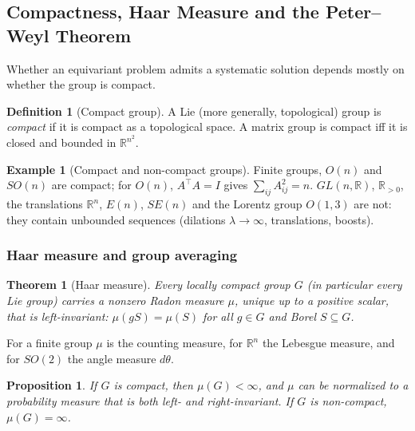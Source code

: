 \documentclass[11pt]{article}
\theoremstyle{plain}
\newtheorem{Theorem}{Theorem}[section]
\newtheorem{Proposition}{Proposition}[section]
\theoremstyle{definition}
\newtheorem{Definition}{Definition}[section]
\newtheorem{Example}{Example}[section]
\begin{document}
\subsection{Compactness, Haar Measure and the Peter--Weyl Theorem}
\label{subsec:compactness-peter-weyl}

Whether an equivariant problem admits a systematic solution depends mostly on whether the group is compact.

\begin{Definition}[Compact group]\label{def:compact-group}
A Lie (more generally, topological) group is \emph{compact} if it is compact as a topological space.
A matrix group is compact iff it is closed and bounded in $\mathbb{R}^{n^2}$.
\end{Definition}

\begin{Example}[Compact and non-compact groups]\label{ex:compactness}
Finite groups, $O(n)$ and $SO(n)$ are compact; for $O(n)$, $A^\top A = I$ gives $\sum_{ij}A_{ij}^2 = n$.
$GL(n,\mathbb{R})$, $\mathbb{R}_{>0}$, the translations $\mathbb{R}^n$, $E(n)$, $SE(n)$ and the Lorentz group $O(1,3)$ are not: they contain unbounded sequences (dilations $\lambda\to\infty$, translations, boosts).
\end{Example}

\subsubsection{Haar measure and group averaging}
\label{subsubsec:haar-measure}

\begin{Theorem}[Haar measure]\label{thm:haar-measure}
Every locally compact group $G$ (in particular every Lie group) carries a nonzero Radon measure $\mu$, unique up to a positive scalar, that is \emph{left-invariant}: $\mu(gS) = \mu(S)$ for all $g\in G$ and Borel $S\subseteq G$.
\end{Theorem}

For a finite group $\mu$ is the counting measure, for $\mathbb{R}^n$ the Lebesgue measure, and for $SO(2)$ the angle measure $d\theta$.

\begin{Proposition}\label{prop:compact-haar-finite}
If $G$ is compact, then $\mu(G)<\infty$, and $\mu$ can be normalized to a probability measure that is both left- and right-invariant. If $G$ is non-compact, $\mu(G) = \infty$.
\end{Proposition}
\end{document}
